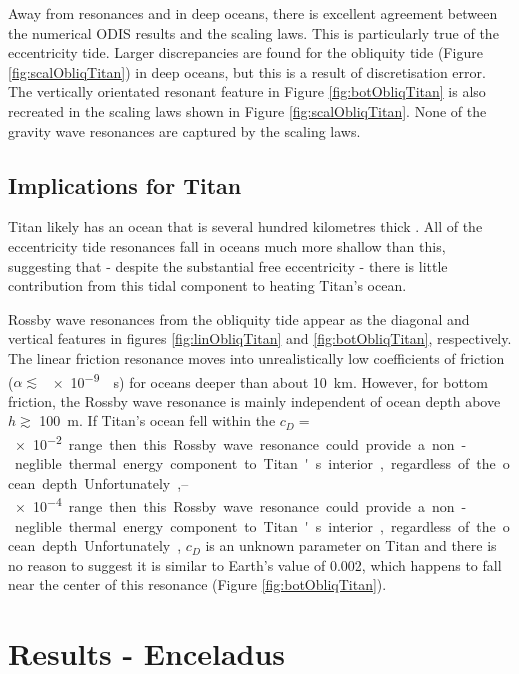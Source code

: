 Away from resonances and in deep oceans, there is excellent agreement between the numerical ODIS results and the scaling laws. This is particularly true of the eccentricity tide. Larger discrepancies are found for the obliquity tide (Figure \ref{fig:scalObliqTitan}) in deep oceans, but this is a result of discretisation error. The vertically orientated resonant feature in Figure \ref{fig:botObliqTitan} is also recreated in the scaling laws shown in Figure \ref{fig:scalObliqTitan}. None of the gravity wave resonances are captured by the scaling laws. 

\subsection{Implications for Titan}

Titan likely has an ocean that is several hundred kilometres thick \citep{sohl2003interior}. All of the eccentricity tide resonances fall in oceans much more shallow than this, suggesting that - despite the substantial free eccentricity - there is little contribution from this tidal component to heating Titan's ocean.

Rossby wave resonances from the obliquity tide appear as the diagonal and vertical features in figures \ref{fig:linObliqTitan} and \ref{fig:botObliqTitan}, respectively. The linear friction resonance moves into unrealistically low coefficients of friction ($\alpha \lesssim$ \SI{e-9}{\per\second}) for oceans deeper than about \SI{10}{\kilo\metre}. However, for bottom friction, the Rossby wave resonance is mainly independent of ocean depth above $h \gtrsim$ \SI{100}{\metre}. If Titan's ocean fell within the $c_D =$ \SIrange{e-2}{e-4} range then this Rossby wave resonance could provide a non-neglible thermal energy component to Titan's interior, regardless of the ocean depth. Unfortunately, $c_D$ is an unknown parameter on Titan and there is no reason to suggest it is similar to Earth's value of \num{0.002}, which happens to fall near the center of this resonance (Figure \ref{fig:botObliqTitan}).

\section{Results - Enceladus \label{sec:results_Enceladus}}

